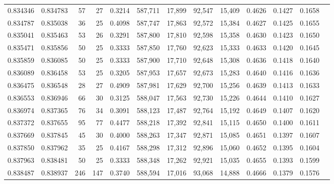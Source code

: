 \begin{tabular}{rrrrrrrrrrrrr}
0.834346 & 0.834783 &    57 &  27 &                                     0.3214 & 587,711 &  17,899 &  92,547 &  15,409 & 0.4626 & 0.1427 & 0.1658 \\
0.834787 & 0.835038 &    36 &  25 &                                     0.4098 & 587,747 &  17,863 &  92,572 &  15,384 & 0.4627 & 0.1425 & 0.1655 \\
0.835041 & 0.835463 &    53 &  26 &                                     0.3291 & 587,800 &  17,810 &  92,598 &  15,358 & 0.4630 & 0.1423 & 0.1650 \\
0.835471 & 0.835856 &    50 &  25 &                                     0.3333 & 587,850 &  17,760 &  92,623 &  15,333 & 0.4633 & 0.1420 & 0.1645 \\
0.835859 & 0.836085 &    50 &  25 &                                     0.3333 & 587,900 &  17,710 &  92,648 &  15,308 & 0.4636 & 0.1418 & 0.1640 \\
0.836089 & 0.836458 &    53 &  25 &                                     0.3205 & 587,953 &  17,657 &  92,673 &  15,283 & 0.4640 & 0.1416 & 0.1636 \\
0.836475 & 0.836548 &    28 &  27 &                                     0.4909 & 587,981 &  17,629 &  92,700 &  15,256 & 0.4639 & 0.1413 & 0.1633 \\
0.836553 & 0.836946 &    66 &  30 &                                     0.3125 & 588,047 &  17,563 &  92,730 &  15,226 & 0.4644 & 0.1410 & 0.1627 \\
0.836974 & 0.837365 &    76 &  34 &                                     0.3091 & 588,123 &  17,487 &  92,764 &  15,192 & 0.4649 & 0.1407 & 0.1620 \\
0.837372 & 0.837655 &    95 &  77 &                                     0.4477 & 588,218 &  17,392 &  92,841 &  15,115 & 0.4650 & 0.1400 & 0.1611 \\
0.837669 & 0.837845 &    45 &  30 &                                     0.4000 & 588,263 &  17,347 &  92,871 &  15,085 & 0.4651 & 0.1397 & 0.1607 \\
0.837850 & 0.837962 &    35 &  25 &                                     0.4167 & 588,298 &  17,312 &  92,896 &  15,060 & 0.4652 & 0.1395 & 0.1604 \\
0.837963 & 0.838481 &    50 &  25 &                                     0.3333 & 588,348 &  17,262 &  92,921 &  15,035 & 0.4655 & 0.1393 & 0.1599 \\
0.838487 & 0.838937 &   246 & 147 &                                     0.3740 & 588,594 &  17,016 &  93,068 &  14,888 & 0.4666 & 0.1379 & 0.1576 \\

\end{tabular}
